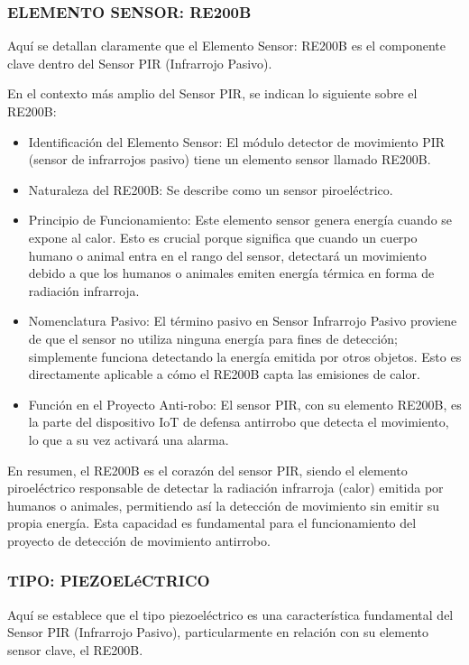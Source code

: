 \documentclass{report}
\begin{document}
\subsubsection{ELEMENTO SENSOR: RE200B}
 Aquí se detallan claramente que el Elemento Sensor: RE200B es el componente clave dentro del 
Sensor PIR (Infrarrojo Pasivo).

En el contexto más amplio del Sensor PIR, se  indican lo siguiente sobre el RE200B:
\begin{itemize}
    \item Identificación del Elemento Sensor: El módulo detector de movimiento PIR (sensor de infrarrojos pasivo) tiene un elemento sensor llamado RE200B.
    \item Naturaleza del RE200B: Se describe como un sensor piroeléctrico.
    \item Principio de Funcionamiento: Este elemento sensor genera energía cuando se expone al calor. Esto es crucial porque significa que cuando un 
    cuerpo humano o animal entra en el rango del sensor, detectará un movimiento debido a que los humanos o animales emiten energía térmica en forma 
    de radiación infrarroja.
    \item Nomenclatura Pasivo: El término pasivo en Sensor Infrarrojo Pasivo proviene de que el sensor no utiliza ninguna energía para fines de 
    detección; simplemente funciona detectando la energía emitida por otros objetos. Esto es directamente aplicable a cómo el RE200B capta las 
    emisiones de calor.
    \item Función en el Proyecto Anti-robo: El sensor PIR, con su elemento RE200B, es la parte del dispositivo IoT de defensa antirrobo que detecta el 
    movimiento, lo que a su vez activará una alarma.
\end{itemize}
En resumen, el RE200B es el corazón del sensor PIR, siendo el elemento piroeléctrico responsable de detectar la radiación infrarroja (calor) emitida 
por humanos o animales, permitiendo así la detección de movimiento sin emitir su propia energía. Esta capacidad es fundamental para el funcionamiento 
del proyecto de detección de movimiento antirrobo.

\subsubsection{TIPO: PIEZOELéCTRICO}
Aquí se establece que el tipo piezoeléctrico es una característica fundamental del Sensor PIR (Infrarrojo 
Pasivo), particularmente en relación con su elemento sensor clave, el RE200B.
\end{document}
